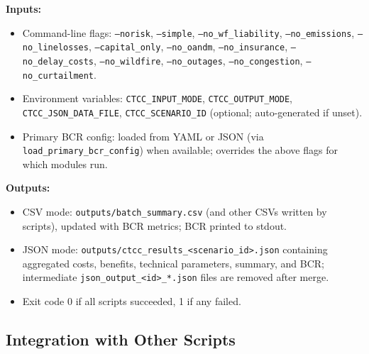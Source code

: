 \documentclass[ctcc_full_documentation.tex]{subfiles}
\begin{document}
\textbf{Inputs:}
\begin{itemize}
    \item Command-line flags: \texttt{--norisk}, \texttt{--simple}, \texttt{--no\_wf\_liability}, \texttt{--no\_emissions}, \texttt{--no\_linelosses}, \texttt{--capital\_only}, \texttt{--no\_oandm}, \texttt{--no\_insurance}, \texttt{--no\_delay\_costs}, \texttt{--no\_wildfire}, \texttt{--no\_outages}, \texttt{--no\_congestion}, \texttt{--no\_curtailment}.
    \item Environment variables: \texttt{CTCC\_INPUT\_MODE}, \texttt{CTCC\_OUTPUT\_MODE}, \texttt{CTCC\_JSON\_DATA\_FILE}, \texttt{CTCC\_SCENARIO\_ID} (optional; auto-generated if unset).
    \item Primary BCR config: loaded from YAML or JSON (via \texttt{load\_primary\_bcr\_config}) when available; overrides the above flags for which modules run.
\end{itemize}

\textbf{Outputs:}
\begin{itemize}
    \item CSV mode: \texttt{outputs/batch\_summary.csv} (and other CSVs written by scripts), updated with BCR metrics; BCR printed to stdout.
    \item JSON mode: \texttt{outputs/ctcc\_results\_<scenario\_id>.json} containing aggregated costs, benefits, technical parameters, summary, and BCR; intermediate \texttt{json\_output\_<id>\_*.json} files are removed after merge.
    \item Exit code 0 if all scripts succeeded, 1 if any failed.
\end{itemize}

\subsection{Integration with Other Scripts}
\end{document}
